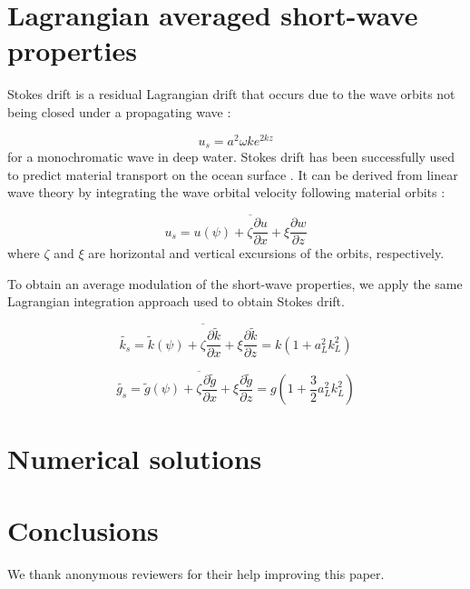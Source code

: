 \documentclass[draft]{agujournal2019}
\begin{document}
\section{Lagrangian averaged short-wave properties}

Stokes drift is a residual Lagrangian drift that occurs due to the wave orbits
not being closed under a propagating wave
\cite{stokes1847,kenyon1969stokes,van2018stokes}:

\begin{equation}
\label{}
u_s = a^2 \omega k e^{2kz}
\end{equation}
for a monochromatic wave in deep water.
Stokes drift has been successfully used to predict material transport on the
ocean surface \cite{rohrs2012observation,curcic2016hurricane}.
It can be derived from linear wave theory by integrating the wave orbital
velocity following material orbits \cite{phillips1966dynamics}:

\begin{equation}
\label{eq:lagrangian_average}
u_s = \overline{
  u(\psi) + 
  \zeta \dfrac{\partial u}{\partial x} +
  \xi \dfrac{\partial w}{\partial z}
}
\end{equation}
where $\zeta$ and $\xi$ are horizontal and vertical excursions of the orbits,
respectively.

To obtain an average modulation of the short-wave properties, we apply the same
Lagrangian integration approach used to obtain Stokes drift.

\begin{equation}
\label{eq:stokes_wavenumber}
\widetilde{k_s} = \overline{
  \widetilde{k}(\psi) +
  \zeta \dfrac{\partial \widetilde{k}}{\partial x} +
  \xi \dfrac{\partial \widetilde{k}}{\partial z}
}
= k \left( 1 + a_L^2 k_L^2 \right)
\end{equation}

\begin{equation}
\label{eq:stokes_gravity}
\widetilde{g_s} = \overline{
  \widetilde{g}(\psi) +
  \zeta \dfrac{\partial \widetilde{g}}{\partial x} +
  \xi \dfrac{\partial \widetilde{g}}{\partial z}
}
= g \left( 1 + \dfrac{3}{2} a_L^2 k_L^2 \right)
\end{equation}

\section{Numerical solutions}

\section{Conclusions}

\acknowledgments
We thank anonymous reviewers for their help improving this paper.


\end{document}
